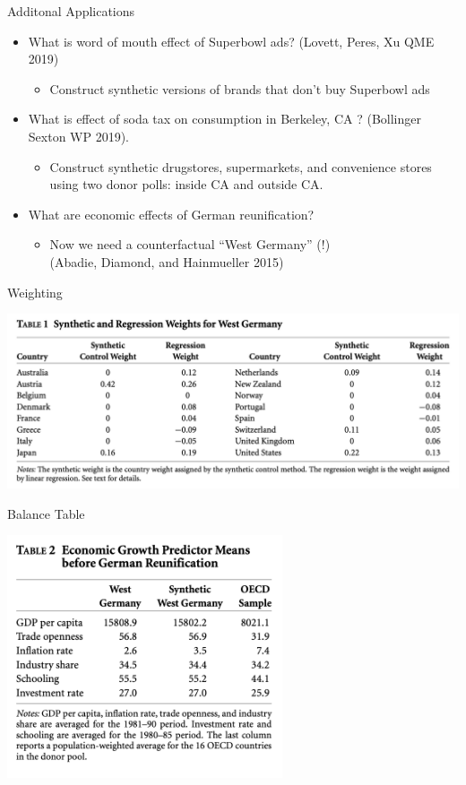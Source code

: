 \documentclass[xcolor=pdftex,dvipsnames,table,mathserif,aspectratio=169]{beamer}
\begin{document}
\begin{frame}{Additonal Applications}
\begin{itemize}
\item What is word of mouth effect of Superbowl ads? (Lovett, Peres, Xu QME 2019)
\begin{itemize}
\item Construct synthetic versions of brands that don't buy Superbowl ads
\end{itemize}
\item What is effect of soda tax on consumption in Berkeley, CA ? (Bollinger Sexton WP 2019).
\begin{itemize}
\item Construct synthetic drugstores, supermarkets, and convenience stores using two donor polls: inside CA and outside CA.
\end{itemize}
\item What are economic effects of German reunification?
\begin{itemize}
\item Now we need a counterfactual ``West Germany'' (!) \\
(Abadie, Diamond, and Hainmueller 2015)
\end{itemize}
\end{itemize}
\end{frame}

\begin{frame}{Weighting}
\begin{center}
\includegraphics[width=6in]{./resources/germany_1.png}
\end{center}
\end{frame}

\begin{frame}{Balance Table}
\begin{center}
\includegraphics[width=3.2in]{./resources/germany_2.png}
\end{center}
\end{frame}
\end{document}
